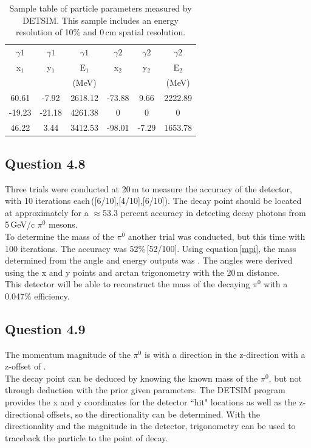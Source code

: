 \documentclass[aps,prl,twocolumn,superscriptaddress,nofootinbib]{revtex4-1}
\begin{document}
\begin{table}[h!] 
\caption{Sample table of particle parameters measured by DETSIM. This sample includes an energy resolution of 10\% and 0\,cm spatial resolution.}
\label{t1}   %
 \begin{center}   %
    \begin{tabular}{|c|c|c|c|c|c|} \hline   %
    $\gamma 1$& $\gamma 1$ & $\gamma 1$ & $\gamma 2$& $\gamma 2$ & $\gamma 2$   \\
x$_1$& y$_1$ & E$_1$ & x$_2$& y$_2$ & E$_2$   \\
&    & (MeV) & &    & (MeV)    \\ \hline \hline \hline


60.61   &-7.92  &2618.12    &-73.88 &9.66   &2222.89\\ \hline
-19.23  &-21.18 &4261.38    &0              &0        &0\\ \hline
46.22   &3.44   &3412.53    &-98.01 &-7.29  &1653.78\\ \hline
     \end{tabular}
  \end{center}
\end{table}


\subsection{Question 4.8}
Three trials were conducted at 20\,m to measure the accuracy of the detector, with 10 iterations each\,([6/10],[4/10],[6/10]). The decay point should be located at approximately  for a $\approx$53.3 percent accuracy in detecting decay photons from 5\,GeV/c $\pi^0$ mesons.
\\
\indent To determine the mass of the $\pi^0$ another trial was conducted, but this time with 100 iterations. The accuracy was 52\%\,[52/100]. Using equation\,\ref{mpi}, the mass determined from the angle and energy outputs was . The angles were derived using the x and y points and arctan trigonometry with the 20\,m distance.
\\
\indent This detector will be able to reconstruct the mass of the decaying $\pi^0$ with a 0.047\% efficiency.

\subsection{Question 4.9}
The momentum magnitude of the $\pi^0$ is  with a direction in the z-direction with a z-offset of \boxed{3.31\degree}.
\\
\indent The decay point can be deduced by knowing the known mass of the $\pi^0$, but not through deduction with the prior given parameters. The DETSIM program provides the x and y coordinates for the detector ``hit" locations as well as the z-directional offsets, so the directionality can be determined. With the directionality and the magnitude in the detector, trigonometry can be used to traceback the particle to the point of decay.
\end{document}
